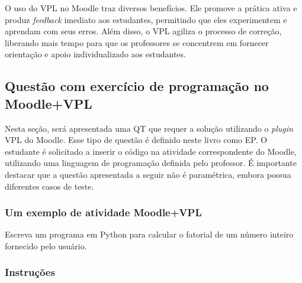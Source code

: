 O uso do VPL no Moodle traz diversos benefícios. Ele promove a prática ativa e produz \textit{feedback} imediato aos estudantes, permitindo que eles experimentem e aprendam com seus erros. Além disso, o VPL agiliza o processo de correção, liberando mais tempo para que os professores se concentrem em fornecer orientação e apoio individualizado aos estudantes.

\subsection{Questão com exercício de programação no Moodle+VPL}

Nesta seção, será apresentada uma QT que requer a solução utilizando o \textit{
plugin} VPL do Moodle. Esse tipo de questão é definido neste livro como EP. O estudante é solicitado a inserir o código na atividade correspondente do Moodle, utilizando uma linguagem de programação definida pelo professor. É importante destacar que a questão apresentada a seguir não é paramétrica, embora possua diferentes casos de teste.

\subsubsection{Um exemplo de atividade Moodle+VPL}

Escreva um programa em Python para calcular o fatorial de um número inteiro fornecido pelo usuário.

\subsubsection{Instruções}

